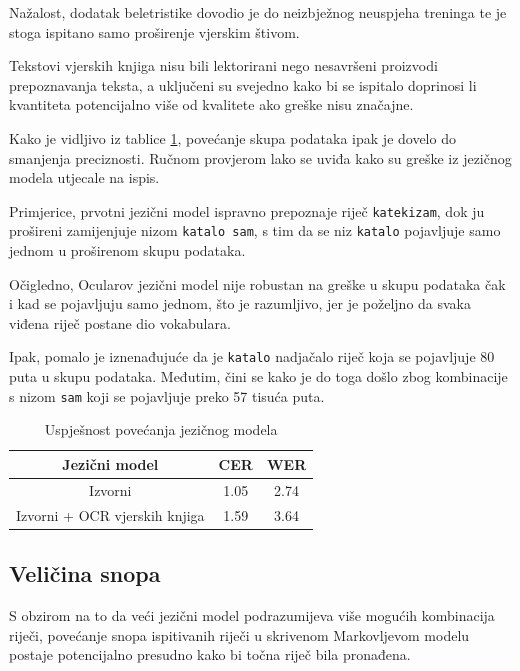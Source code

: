 \documentclass[zavrsnirad]{fer}
\begin{document}
Nažalost, dodatak beletristike dovodio je do neizbježnog neuspjeha treninga te je stoga ispitano samo proširenje vjerskim štivom.

Tekstovi vjerskih knjiga nisu bili lektorirani nego nesavršeni proizvodi prepoznavanja teksta, a uključeni su svejedno kako bi se ispitalo doprinosi li kvantiteta potencijalno više od kvalitete ako greške nisu značajne.

Kako je vidljivo iz tablice \ref{tab:lm_performance}, povećanje skupa podataka ipak je dovelo do smanjenja preciznosti. Ručnom provjerom lako se uviđa kako su greške iz jezičnog modela utjecale na ispis.

Primjerice, prvotni jezični model ispravno prepoznaje riječ \texttt{katekizam}, dok ju prošireni zamijenjuje nizom \texttt{katalo sam}, s tim da se niz \texttt{katalo} pojavljuje samo jednom u proširenom skupu podataka.

Očigledno, Ocularov jezični model nije robustan na greške u skupu podataka čak i kad se pojavljuju samo jednom, što je razumljivo, jer je poželjno da svaka viđena riječ postane dio vokabulara.

Ipak, pomalo je iznenađujuće da je \texttt{katalo} nadjačalo riječ koja se pojavljuje 80 puta u skupu podataka. Međutim, čini se kako je do toga došlo zbog kombinacije s nizom \texttt{sam} koji se pojavljuje preko 57 tisuća puta.



\bgroup
\def\arraystretch{1.25}
\begin{table}[h]
	\centering
	\begin{tabular}{|c|c|c|}
		\hline
		 \textbf{Jezični model} & \textbf{CER} & \textbf{WER} \\ \hline
		 Izvorni & 1.05 & 2.74 \\ \hline
		 Izvorni + OCR vjerskih knjiga & 1.59 & 3.64 \\ \hline
	\end{tabular}
	\caption{Uspješnost povećanja jezičnog modela}
	\label{tab:lm_performance}
\end{table}
\egroup



\subsection{Veličina snopa}

S obzirom na to da veći jezični model podrazumijeva više mogućih kombinacija riječi, povećanje snopa ispitivanih riječi u skrivenom Markovljevom modelu postaje potencijalno presudno kako bi točna riječ bila pronađena.
\end{document}
